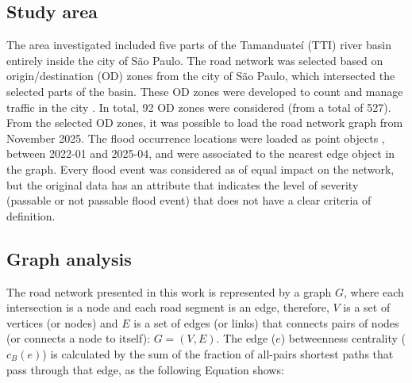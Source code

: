 \documentclass{pssbmac}
\begin{document}
\subsection{Study area}

The area investigated included five parts of the Tamanduateí (TTI) river basin entirely inside the city of São Paulo\cite{prefeituradesaopauloPlanoDiretorDrenagem2024}. The road network was selected based on origin/destination (OD) zones from the city of São Paulo, which intersected the selected parts of the basin. These OD zones were developed to count and manage traffic in the city \cite{metrospPesquisaOrigemDestino2023}. In total, 92 OD zones were considered (from a total of 527). From the selected OD zones, it was possible to load the road network graph from November 2025. The flood occurrence locations were loaded as point objects \cite{cge-spAlagamentos2025}, between 2022-01 and 2025-04, and were associated to the nearest edge object in the graph. Every flood event was considered as of equal impact on the network, but the original data has an attribute that indicates the level of severity (passable or not passable flood event) that does not have a clear criteria of definition.




\subsection{Graph analysis}

The road network presented in this work is represented by a graph $G$, where each intersection is a node and each road segment is an edge, therefore,  $V$ is a set of vertices (or nodes) and $E$ is a set of edges (or links) that connects pairs of nodes (or connects a node to itself): $G = (V, E)$. The edge ($e$) betweenness centrality ($c_B(e)$) is calculated by the sum of the fraction of all-pairs shortest paths that pass through that edge, as the following Equation shows:
\end{document}

